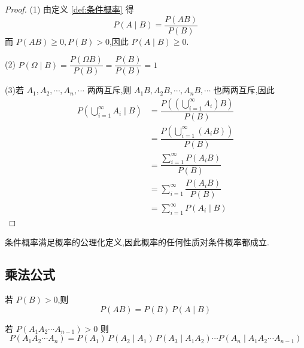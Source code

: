 \begin{proof}
    (1) 由定义 \ref{def:条件概率} 得
    $$P(A \mid B) = \dfrac{P(AB)}{P(B)}$$
    而 $P(AB) \geqslant 0, P(B)>0$,因此 $P(A \mid B) \geqslant 0$.

    \vspace{0.5em}

    (2) $P(\varOmega \mid B) = \dfrac{P(\varOmega B)}{P(B)} = \dfrac{P(B)}{P(B)} = 1$

    \vspace{0.5em}

    (3)若 $A_1, A_2, \cdots, A_n, \cdots$ 两两互斥,则 $A_1 B, A_2 B, \cdots, A_n B, \cdots$ 也两两互斥,因此
    $$
    \begin{aligned}
        P \left( \bigcup_{i=1}^{\infty} A_i \mid B \right) &= \dfrac{P \left( \left( \displaystyle\bigcup_{i=1}^{\infty} A_i \right) B \right)}{P(B)} \\
        &= \dfrac{P \left( \displaystyle\bigcup_{i=1}^{\infty} (A_i B) \right)}{P(B)} \\
        &= \dfrac{\displaystyle\sum_{i=1}^{\infty} P(A_i B)}{P(B)} \\
        &= \sum_{i=1}^{\infty} \dfrac{P(A_i B)}{P(B)} \\
        &= \sum_{i=1}^{\infty} P(A_i \mid B)
    \end{aligned}
    $$

    \vspace{-2em}
\end{proof}

\begin{note}
    \indent 条件概率满足概率的公理化定义,因此概率的任何性质对条件概率都成立.
\end{note}

\subsection{乘法公式}

\begin{theorem}[][乘法公式]
    \indent 若 $P(B)>0$,则
    \begin{equation} \label{equation:乘法公式}
        P(AB) = P(B) \, P(A \mid B)    
    \end{equation}
    
    若 $P(A_1 A_2 \cdots A_{n-1}) > 0$ 则
    \begin{equation} \label{equation:一般的乘法公式}
        P(A_1 A_2 \cdots A_n) = P(A_1) \, P(A_2 \mid A_1) \, P(A_3 \mid A_1 A_2) \cdots P(A_n \mid A_1 A_2 \cdots A_{n-1})
    \end{equation}
\end{theorem}

